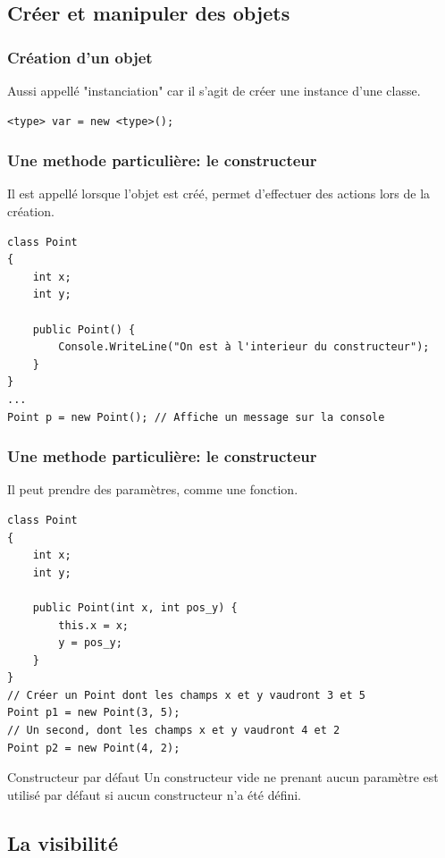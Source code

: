 \documentclass{beamer}
\begin{document}
\subsection{Créer et manipuler des objets}

\begin{frame}[fragile]
\frametitle{Création d'un objet}
Aussi appellé "instanciation" car il s'agit de créer une instance d'une classe.
\begin{lstlisting}
<type> var = new <type>();
\end{lstlisting}
\end{frame}

\begin{frame}[fragile]
\frametitle{Une methode particulière: le constructeur}
Il est appellé lorsque l'objet est créé, permet d'effectuer des actions lors de la création.
\begin{lstlisting}
class Point
{
    int x;
    int y;
    
    public Point() {
        Console.WriteLine("On est à l'interieur du constructeur");
    }
}
...
Point p = new Point(); // Affiche un message sur la console
\end{lstlisting}
\end{frame}

\begin{frame}[fragile]
\frametitle{Une methode particulière: le constructeur}
Il peut prendre des paramètres, comme une fonction.
\begin{lstlisting}
class Point
{
    int x;
    int y;
    
    public Point(int x, int pos_y) {
        this.x = x;
        y = pos_y;
    }
}
// Créer un Point dont les champs x et y vaudront 3 et 5
Point p1 = new Point(3, 5);
// Un second, dont les champs x et y vaudront 4 et 2
Point p2 = new Point(4, 2);
\end{lstlisting}
\end{frame}

\begin{frame}
  \begin{alertblock}{Constructeur par défaut}
Un constructeur vide ne prenant aucun paramètre est utilisé par défaut si aucun constructeur n'a été défini.
\end{alertblock}
\end{frame}

\subsection{La visibilité}
\end{document}
